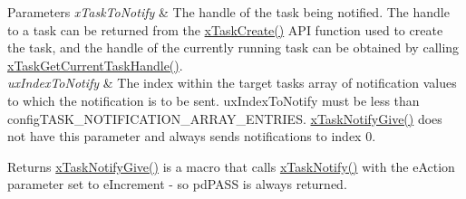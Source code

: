 \begin{DoxyParams}{Parameters}
{\em x\+Task\+To\+Notify} & The handle of the task being notified. The handle to a task can be returned from the \hyperlink{vendor_2ceedling_2plugins_2freertos_2src_2freertos_2include_2task_8h_adf67e7cd0bfd1eda9e8afd048206f7c2}{x\+Task\+Create()} A\+PI function used to create the task, and the handle of the currently running task can be obtained by calling \hyperlink{externals_2freertos_2include_2task_8h_a85a0f9c9f817b18686efbf8f37c72dfc}{x\+Task\+Get\+Current\+Task\+Handle()}.\\
\hline
{\em ux\+Index\+To\+Notify} & The index within the target task\textquotesingle{}s array of notification values to which the notification is to be sent. ux\+Index\+To\+Notify must be less than config\+T\+A\+S\+K\+\_\+\+N\+O\+T\+I\+F\+I\+C\+A\+T\+I\+O\+N\+\_\+\+A\+R\+R\+A\+Y\+\_\+\+E\+N\+T\+R\+I\+ES. \hyperlink{externals_2freertos_2include_2task_8h_ac60cbd05577a3e4f3c3587dd9b213930}{x\+Task\+Notify\+Give()} does not have this parameter and always sends notifications to index 0.\\
\hline
\end{DoxyParams}
\begin{DoxyReturn}{Returns}
\hyperlink{externals_2freertos_2include_2task_8h_ac60cbd05577a3e4f3c3587dd9b213930}{x\+Task\+Notify\+Give()} is a macro that calls \hyperlink{externals_2freertos_2include_2task_8h_a0d2d54fb8a64011dfbb54983e4ed06bd}{x\+Task\+Notify()} with the e\+Action parameter set to e\+Increment -\/ so pd\+P\+A\+SS is always returned. 
\end{DoxyReturn}
